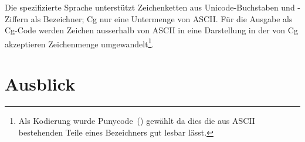\documentclass[twoside,a4paper,fleqn,12pt]{article}
\begin{document}
Die spezifizierte Sprache unterstützt Zeichenketten aus Unicode-Buchstaben und -Ziffern als Bezeichner;
Cg nur eine Untermenge von ASCII. Für die Ausgabe als Cg-Code werden Zeichen ausserhalb von ASCII in eine Darstellung in der von Cg akzeptieren
Zeichenmenge umgewandelt\footnote{Als Kodierung wurde Punycode~(\cite{rfc3492}) gewählt da dies die aus ASCII bestehenden Teile eines Bezeichners
gut lesbar lässt.}.


\section{Ausblick}


\cleardoublepage
\appendix

\end{document}
